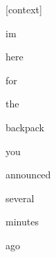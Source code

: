 \documentclass[varwidth]{standalone}
\begin{document}
\begin{CJK*}{UTF8}{gbsn}
{\setlength{\fboxsep}{0pt}\colorbox{white!0}{\parbox{0.9\textwidth}{
\colorbox{red!0.03556545823812485}{\strut [context]} \colorbox{red!0.02075139991939068}{\strut im} \colorbox{red!0.06192512810230255}{\strut here} \colorbox{red!0.5329405665397644}{\strut for} \colorbox{red!0.08149551600217819}{\strut the} \colorbox{red!0.02228395827114582}{\strut backpack} \colorbox{red!0.019224248826503754}{\strut you} \colorbox{red!0.040403254330158234}{\strut announced} \colorbox{red!0.19245602190494537}{\strut several} \colorbox{red!51.19725036621094}{\strut minutes} \colorbox{red!47.79570770263672}{\strut ago} 
}}}
\end{CJK*}
\end{document}
